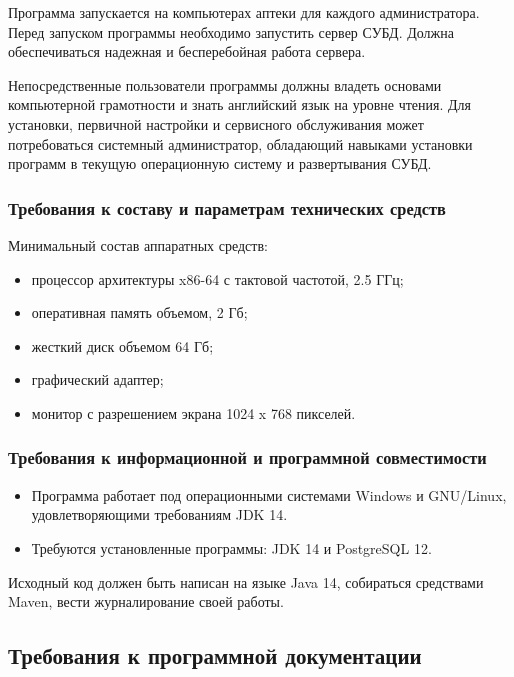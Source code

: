 Программа запускается на компьютерах аптеки для каждого администратора. Перед
запуском программы необходимо запустить сервер СУБД. Должна обеспечиваться
надежная и бесперебойная работа сервера.

Непосредственные пользователи программы должны владеть основами компьютерной
грамотности и знать английский язык на уровне чтения. Для установки, первичной
настройки и сервисного обслуживания может потребоваться системный
администратор, обладающий навыками установки программ в текущую операционную
систему и развертывания СУБД.

\subsubsection{Требования к составу и параметрам технических средств}

Минимальный состав аппаратных средств:
\begin{itemize}
    \item процессор архитектуры x86-64 с тактовой частотой, 2.5 ГГц;
    \item оперативная память объемом, 2 Гб;
    \item жесткий диск объемом 64 Гб;
    \item графический адаптер;
    \item монитор с разрешением экрана 1024 x 768 пикселей.
\end{itemize}

\subsubsection{Требования к информационной и программной совместимости}

\begin{itemize}
    \item Программа работает под операционными системами Windows и GNU/Linux,
        удовлетворяющими требованиям JDK 14.
    \item Требуются установленные программы: JDK 14 и PostgreSQL 12.
\end{itemize}

Исходный код должен быть написан на языке Java 14, собираться средствами Maven,
вести журналирование своей работы.

\subsection{Требования к программной документации}

